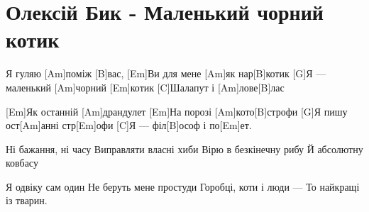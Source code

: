 \section{Олексій Бик - Маленький чорний котик}
\begin{guitar}
[Em]Я гуляю [Am]поміж [B]вас,
[Em]Ви для мене [Am]як нар[B]котик
[G]Я — маленький [Am]чорний [Em]котик
[C]Шалапут і [Am]лове[B]лас

[Em]Як останній [Am]драндулет
[Em]На порозі [Am]кото[B]строфи
[G]Я пишу ост[Am]анні стр[Em]офи
[C]Я — філ[B]ософ і по[Em]ет.

Ні бажання, ні часу
Виправляти власні хиби
Вірю в безкінечну рибу 
Й абсолютну ковбасу

Я одвіку сам один
Не беруть мене простуди
Горобці, коти і люди —
То найкращі із тварин.
\end{guitar}
